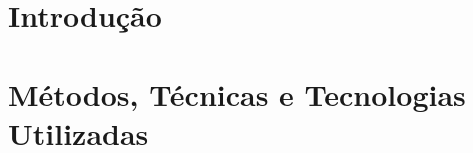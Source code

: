 \documentclass[brazil]{packages/icmc}
\begin{document}

\chapter{Introdução}
\label{chapter:introducao}


\chapter{Métodos, Técnicas e Tecnologias Utilizadas}
\label{chapter:metodos}


% 

% 

% 

% 

% 

% 

% 
\end{document}
